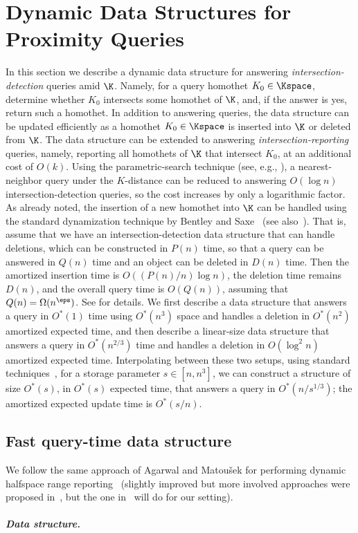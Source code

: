 \section{Dynamic Data Structures for Proximity Queries} \label{sec:ds}
%
In this section we describe a dynamic data structure for answering \emph{intersection-detection}
queries amid $\K$. Namely, for a query homothet $K_0 \in \Kspace$, determine whether $K_0$ intersects
some homothet of $\K$, and, if the answer is yes, return such a homothet.
In addition to answering queries, the data structure can be updated efficiently
as a homothet $K_0\in\Kspace$ is inserted into $\K$ or deleted from $\K$. 
The data structure can be extended to answering \emph{intersection-reporting} queries, namely,
reporting all homothets of $\K$ that intersect $K_0$, at an additional cost of $O(k)$. 
\iffullver
Using the parametric-search technique
(see, e.g., \cite{AM93,AM95}), a nearest-neighbor query under the $K$-distance can be reduced 
to answering $O(\log n)$ intersection-detection queries, so the cost increases by only a logarithmic factor.
\fi
%
As already noted, the insertion of a new homothet into $\K$ can be handled using the standard 
dynamization technique by Bentley and Saxe~\cite{BS80} (see also~\cite{AM95}).
That is, assume that we have an intersection-detection data structure that can handle deletions,
which can be constructed in $P(n)$ time, so that a query can be answered in $Q(n)$ time and an object can be deleted in $D(n)$ time.
Then the amortized insertion time is $O((P(n)/n)\log n)$, the deletion time remains $D(n)$, 
and the overall query time is $O(Q(n))$, assuming that $Q(n) = \Omega(n^\eps)$.
\iffullver
See \cite{BS80} for details.
\fi
%
We first describe a data structure that answers a query in $O^*(1)$ time using
$O^*(n^3)$ space and handles a deletion in $O^*(n^2)$ amortized expected time, and then describe a linear-size data 
structure that answers a query in $O^*(n^{2/3})$ time and handles a deletion in $O(\log^2 n)$ amortized expected time. 
\iffullver
Interpolating between these two setups, using standard techniques~\cite{AAEKS}, 
for a storage parameter $s\in [n,n^3]$, 
we can construct a structure of size $O^*(s)$, in $O^*(s)$ expected time,
that answers a query in $O^*(n/s^{1/3})$;
the amortized expected update time is $O^*(s/n)$.
\fi
%
\subsection{Fast query-time data structure}
\label{subsec:log}
%
We follow the same approach of Agarwal and Matou\v{s}ek for performing dynamic halfspace range 
reporting~\cite{AM95} (slightly improved but more involved approaches were proposed 
in~\cite{Chan:le,KMRSS}, but the one in~\cite{AM95} will do for our setting).  
%
\ifsocgproc 
\subparagraph*{Data structure.}
\else

